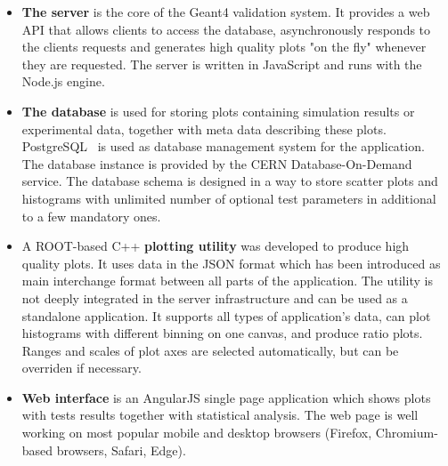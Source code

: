 \begin{itemize}

\item \textbf{The server} is the core of the Geant4 validation system. It provides a web API that allows clients to access the database, asynchronously responds to the clients requests and generates high quality plots "on the fly" whenever they are requested.
The server is written in JavaScript and runs with the Node.js engine.

\item \textbf{The database} is used for storing plots containing simulation results or experimental data, together with meta data describing these plots.
PostgreSQL~\cite{Postgre} is used as database management system for the application. The database instance is provided by the CERN Database-On-Demand service. The database schema is designed in a way to store scatter plots and histograms with unlimited number of optional test parameters in additional to a few mandatory ones.


\item A ROOT-based C++ \textbf{plotting utility} was developed to produce high quality plots. It uses data in the JSON format which has been introduced as main interchange format between all parts of the application. The utility is not deeply integrated in the server infrastructure and can be used as a standalone application. It supports all types of application's data, can plot histograms with different binning on one canvas, and produce ratio plots. Ranges and scales of plot axes are selected automatically, but can be overriden if necessary. %

\item \textbf{Web interface} is an AngularJS single page application which shows plots with tests results together with statistical analysis. The web page is well working on most popular mobile and desktop browsers (Firefox, Chromium-based browsers, Safari, Edge).




\end{itemize}
